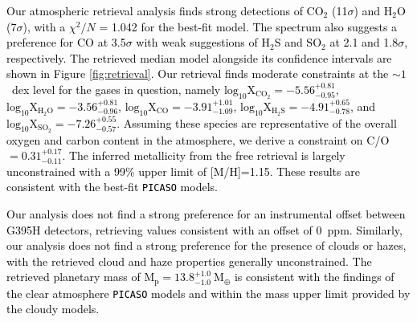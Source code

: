 \documentclass[twocolumn]{aastex63} %
\newcommand{\newedit}[1]{\textcolor{black}{#1}}
\begin{document}
\newedit{Our atmospheric retrieval analysis finds strong detections of CO$_2$ (11$\sigma$) and H$_2$O (7$\sigma$), with  a $\chi^{2}/N$ = 1.042 for the best-fit model. The spectrum also suggests a preference for CO at 3.5$\sigma$ with weak suggestions of H$_2$S and SO$_2$ at 2.1 and 1.8$\sigma$, respectively. The retrieved median model alongside its confidence intervals are shown in Figure \ref{fig:retrieval}. Our retrieval finds moderate constraints at the $\sim1$~dex level for the gases in question, namely $\text{log}_{10} \text{X}_{\text{CO}_2} = -5.56 ^{+0.81}_{-0.95}$, $\text{log}_{10} \text{X}_{\text{H}_2\text{O}} = -3.56 ^{+0.81}_{-0.96}$, $\text{log}_{10} \text{X}_{\text{CO}} = -3.91 ^{+1.01}_{-1.09}$, $\text{log}_{10} \text{X}_{\text{H}_2\text{S}} = -4.91 ^{+0.65}_{-0.78}$, and $\text{log}_{10} \text{X}_{\text{SO}_2} = -7.26 ^{+0.55}_{-0.57}$. Assuming these species are representative of the overall oxygen and carbon content in the atmosphere, we derive a constraint on C/O$=0.31^{+0.17}_{-0.11}$. The inferred metallicity from the free retrieval is largely unconstrained with a 99\% upper limit of [M/H]=1.15. These results are consistent with the best-fit \texttt{PICASO} models. }

\newedit{Our analysis does not find a strong preference for an instrumental offset between G395H detectors, retrieving values consistent with an offset of 0~ppm. Similarly, our analysis does not find a strong preference for the presence of clouds or hazes, with the retrieved cloud and haze properties generally unconstrained. The retrieved planetary mass of $\text{M}_\text{p}= 13.8^{+1.0}_{-1.0}~\text{M}_{\oplus}$ is consistent with the findings of the clear atmosphere \texttt{PICASO} models and within the mass upper limit provided by the cloudy models.}
\end{document}
